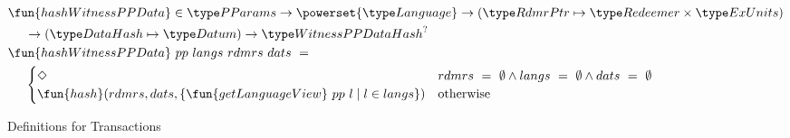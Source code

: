 \begin{figure*}[htb]
  \begin{align*}
  &\fun{hashWitnessPPData} \in\PParams \to \powerset{\Language} \to (\RdmrPtr \mapsto \Redeemer \times \ExUnits) \\
  &~~~~ \to (\DataHash \mapsto \Datum) \to \WitnessPPDataHash^? \\
  &\fun{hashWitnessPPData}~{pp}~{langs}~{rdmrs}~{dats}~=~ \\
                    &~~~~ \begin{cases}
                          \Nothing & rdmrs~=~\emptyset \land langs~=~\emptyset \land dats~=~\emptyset \\
                          \fun{hash} (rdmrs, dats, \{ \fun{getLanguageView}~pp~l \mid l \in langs \}) & \text{otherwise}
                        \end{cases}
  \end{align*}
  \caption{Definitions for Transactions}
  \label{fig:defs:utxo-shelley-1}
\end{figure*}


